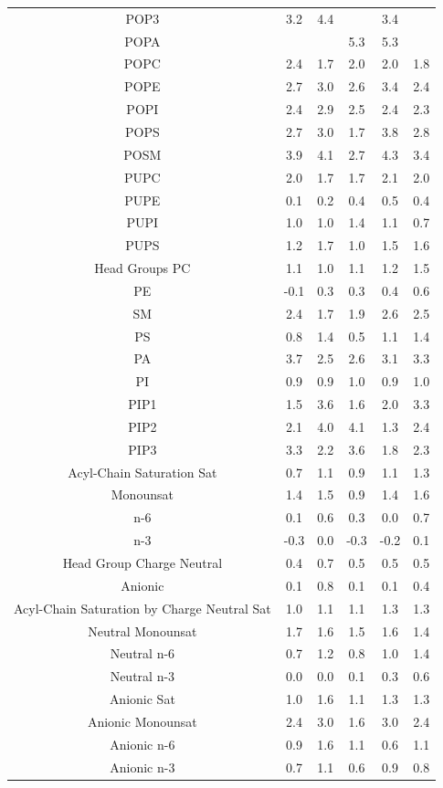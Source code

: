 \documentclass[12pt]{ruthesis_nofloat}
\begin{document}
\begin{table}
{\begin{tabular}{| c || ccccc |}
POP3&3.2&4.4&            &3.4&            \\
POPA    &            &            &5.3&5.3&       \\     
POPC    &2.4&1.7&2.0&2.0&1.8\\
POPE    &2.7&3.0&2.6&3.4&2.4\\
POPI    &2.4&2.9&2.5&2.4&2.3\\
POPS    &2.7&3.0&1.7&3.8&2.8\\
POSM    &3.9&4.1&2.7&4.3&3.4\\
PUPC    &2.0&1.7&1.7&2.1&2.0\\
PUPE    &0.1&0.2&0.4&0.5&0.4\\
PUPI    &1.0&1.0&1.4&1.1&0.7\\
PUPS    &1.2&1.7&1.0&1.5&1.6\\
\hline
Head Groups 
PC      &1.1&1.0&1.1&1.2&1.5\\
PE      &-0.1&0.3&0.3&0.4&0.6\\
SM      &2.4&1.7&1.9&2.6&2.5\\
PS      &0.8&1.4&0.5&1.1&1.4\\
PA      &3.7&2.5&2.6&3.1&3.3\\
PI      &0.9&0.9&1.0&0.9&1.0\\
PIP1&1.5&3.6&1.6&2.0&3.3\\
PIP2&2.1&4.0&4.1&1.3&2.4\\
PIP3&3.3&2.2&3.6&1.8&2.3\\
\hline
Acyl-Chain Saturation 
Sat      &0.7&1.1&0.9&1.1&1.3\\
Monounsat      &1.4&1.5&0.9&1.4&1.6\\
n-6&0.1&0.6&0.3&0.0&0.7\\
n-3&-0.3&0.0&-0.3&-0.2&0.1\\
\hline
Head Group Charge 
Neutral &0.4&0.7&0.5&0.5&0.5\\
Anionic &0.1&0.8&0.1&0.1&0.4\\
\hline
Acyl-Chain Saturation by Charge 
Neutral Sat    &1.0&1.1&1.1&1.3&1.3\\
Neutral Monounsat    &1.7&1.6&1.5&1.6&1.4\\
Neutral n-6&0.7&1.2&0.8&1.0&1.4\\
Neutral n-3&0.0&0.0&0.1&0.3&0.6\\
\hline
Anionic Sat     &1.0&1.6&1.1&1.3&1.3\\
Anionic Monounsat    &2.4&3.0&1.6&3.0&2.4\\
Anionic n-6&0.9&1.6&1.1&0.6&1.1\\
Anionic n-3&0.7&1.1&0.6&0.9&0.8\\
\hline
\end{tabular}}
\end{table}
\end{document}
